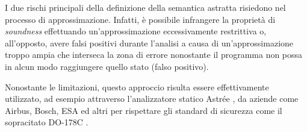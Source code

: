 I due rischi principali della definizione della semantica astratta risiedono nel processo di approssimazione.
Infatti, è possibile infrangere la proprietà di \textit{soundness} effettuando un'approssimazione eccessivamente restrittiva o, all'opposto, avere falsi positivi durante l'analisi a causa di un'approssimazione troppo ampia che interseca la zona di errore nonostante il programma non possa in alcun modo raggiungere quello stato (falso positivo).

Nonostante le limitazioni, questo approccio risulta essere effettivamente utilizzato, ad esempio  attraverso l'analizzatore statico Astrée \cite{AbsIntProfile}, da aziende come Airbus, Bosch, ESA ed altri per rispettare gli standard di sicurezza come il sopracitato DO-178C \cite{AbsIntSuccess}.
